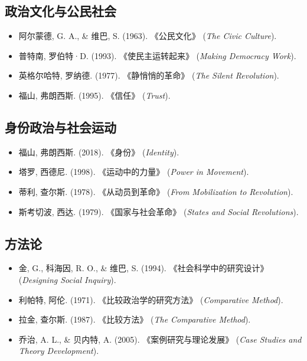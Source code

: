 \documentclass[a5paper, 11pt, openany]{ctexbook}
\begin{document}
\subsection*{政治文化与公民社会}
\begin{itemize}
    \item 阿尔蒙德, G. A., \& 维巴, S. (1963). 《公民文化》 (\textit{The Civic Culture}).
    \item 普特南, 罗伯特·D. (1993). 《使民主运转起来》 (\textit{Making Democracy Work}).
    \item 英格尔哈特, 罗纳德. (1977). 《静悄悄的革命》 (\textit{The Silent Revolution}).
    \item 福山, 弗朗西斯. (1995). 《信任》 (\textit{Trust}).
\end{itemize}

\subsection*{身份政治与社会运动}
\begin{itemize}
    \item 福山, 弗朗西斯. (2018). 《身份》 (\textit{Identity}).
    \item 塔罗, 西德尼. (1998). 《运动中的力量》 (\textit{Power in Movement}).
    \item 蒂利, 查尔斯. (1978). 《从动员到革命》 (\textit{From Mobilization to Revolution}).
    \item 斯考切波, 西达. (1979). 《国家与社会革命》 (\textit{States and Social Revolutions}).
\end{itemize}

\subsection*{方法论}
\begin{itemize}
    \item 金, G., 科海因, R. O., \& 维巴, S. (1994). 《社会科学中的研究设计》 (\textit{Designing Social Inquiry}).
    \item 利帕特, 阿伦. (1971). 《比较政治学的研究方法》 (\textit{Comparative Method}).
    \item 拉金, 查尔斯. (1987). 《比较方法》 (\textit{The Comparative Method}).
    \item 乔治, A. L., \& 贝内特, A. (2005). 《案例研究与理论发展》 (\textit{Case Studies and Theory Development}).
\end{itemize}
\end{document}
